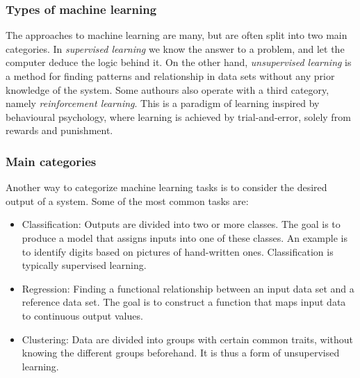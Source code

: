 \documentclass{beamer}
\begin{document}
\begin{frame}
\frametitle{Types of machine learning}

\begin{block}{}
The approaches to machine learning are many, but are often split into two main categories. 
In \emph{supervised learning} we know the answer to a problem,
and let the computer deduce the logic behind it. On the other hand, \emph{unsupervised learning}
is a method for finding patterns and relationship in data sets without any prior knowledge of the system.
Some authours also operate with a third category, namely \emph{reinforcement learning}. This is a paradigm 
of learning inspired by behavioural psychology, where learning is achieved by trial-and-error, 
solely from rewards and punishment.
\end{block}
\end{frame}

\begin{frame}
\frametitle{Main categories}

\begin{block}{}
Another way to categorize machine learning tasks is to consider the desired output of a system.
Some of the most common tasks are:

\begin{itemize}
  \item Classification: Outputs are divided into two or more classes. The goal is to   produce a model that assigns inputs into one of these classes. An example is to identify  digits based on pictures of hand-written ones. Classification is typically supervised learning.

  \item Regression: Finding a functional relationship between an input data set and a reference data set.   The goal is to construct a function that maps input data to continuous output values.

  \item Clustering: Data are divided into groups with certain common traits, without knowing the different groups beforehand.  It is thus a form of unsupervised learning.
\end{itemize}

\noindent
\end{block}
\end{frame}
\end{document}
